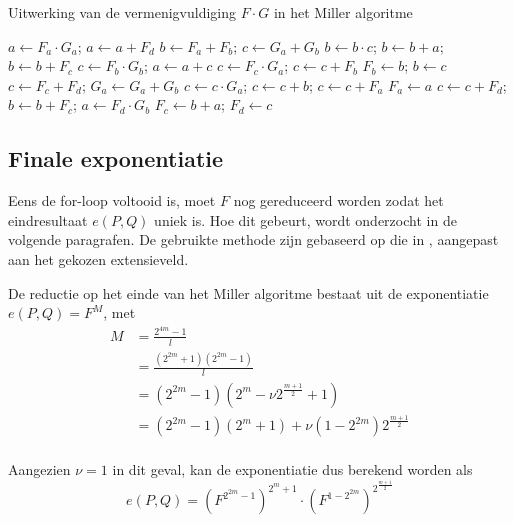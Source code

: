 \begin{algorithm}[h]
	\caption{Uitwerking van de vermenigvuldiging $F \cdot G$ in het Miller algoritme}
	\label{algoritme-implementatie-miller-fg}
	$a \leftarrow F_a \cdot G_a$; $a \leftarrow a + F_d$\;
	$b \leftarrow F_a + F_b$; $c \leftarrow G_a + G_b$\;
	$b \leftarrow b \cdot c$; $b \leftarrow b + a$; $b \leftarrow b + F_c$\;
	$c \leftarrow F_b \cdot G_b$; $a \leftarrow a + c$\;
	$c \leftarrow F_c \cdot G_a$;	$c \leftarrow c + F_b$\;
	$F_b \leftarrow b$; $b \leftarrow c$\;
	$c \leftarrow F_c + F_d$; $G_a \leftarrow G_a + G_b$\;
	$c \leftarrow c \cdot G_a$; $c \leftarrow c + b$; $c \leftarrow c + F_a$\;
	$F_a \leftarrow a$\;
	$c \leftarrow c + F_d$; $b \leftarrow b + F_c$; $a \leftarrow F_d \cdot G_b$\;
	$F_c \leftarrow b + a$; $F_d \leftarrow c$\;
\end{algorithm}

\subsection{Finale exponentiatie\label{subsectie-implementatie-miller-finale-exp}}

Eens de for-loop voltooid is, moet $F$ nog gereduceerd worden zodat het eindresultaat $e(P, Q)$ uniek is. Hoe dit gebeurt, wordt onderzocht in de volgende paragrafen. De gebruikte methode zijn gebaseerd op die in \cite{beuchat}, aangepast aan het gekozen extensieveld.

De reductie op het einde van het Miller algoritme bestaat uit de exponentiatie $e(P, Q) = F^M$, met
\[\begin{aligned}
M	&= \frac{2^{4m} - 1}{l}\\
	&= \frac{(2^{2m} + 1)(2^{2m} - 1)}{l}\\
	&= (2^{2m} - 1)(2^m - \nu 2^{\frac{m + 1}{2}} + 1)\\
	&= (2^{2m} - 1)(2^m + 1) + \nu(1 - 2^{2m})2^{\frac{m + 1}{2}}\\
\end{aligned}\]

Aangezien $\nu = 1$ in dit geval, kan de exponentiatie dus berekend worden als
\[e(P, Q) = \left(F^{2^{2m} - 1}\right)^{2^m + 1} \cdot \left(F^{1 - 2^{2m}}\right)^{2^{\frac{m + 1}{2}}}\]

